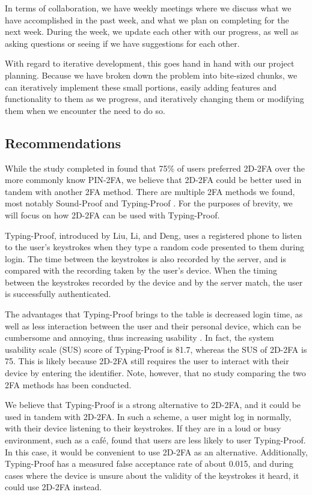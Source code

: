 \documentclass[11pt]{article} %
\begin{document}
In terms of collaboration, we have weekly meetings where we discuss what
we have accomplished in the past week, and what we plan on completing
for the next week. During the week, we update each other with our
progress, as well as asking questions or seeing if we have suggestions
for each other. 

With regard to iterative development, this goes hand in hand with our
project planning. Because we have broken down the problem into
bite-sized chunks, we can iteratively implement these small portions,
easily adding features and functionality to them as we progress, and
iteratively changing them or modifying them when we encounter the need
to do so.

\subsection{Recommendations}

While the study completed in \cite{shirvanian2d2fa} found that 75\% of
users preferred 2D-2FA over the more commonly know PIN-2FA, we believe
that 2D-2FA could be better used in tandem with another 2FA method.
There are multiple 2FA methods we found, most notably Sound-Proof
\cite{soundProof} and Typing-Proof \cite{liuTypingProof}. For the
purposes of brevity, we will focus on how 2D-2FA can be used with
Typing-Proof. 

Typing-Proof, introduced by Liu, Li, and Deng, uses a registered phone
to listen to the user's keystrokes when they type a random code
presented to them during login. The time between the keystrokes is also
recorded by the server, and is compared with the recording taken by the
user's device. When the timing between the keystrokes recorded by the
device and by the server match, the user is successfully authenticated. 

The advantages that Typing-Proof brings to the table is decreased login
time, as well as less interaction between the user and their personal
device, which can be cumbersome and annoying, thus increasing usability
\cite{liuTypingProof}. In fact, the system usability scale (SUS) score
of Typing-Proof is 81.7, whereas the SUS of 2D-2FA is 75. This is likely
because 2D-2FA still requires the user to interact with their device by
entering the identifier. Note, however, that no study comparing the two
2FA methods has been conducted.  

We believe that Typing-Proof is a strong alternative to 2D-2FA, and it
could be used in tandem with 2D-2FA. In such a scheme, a user might
log in normally, with their device listening to their keystrokes. If
they are in a loud or busy environment, such as a caf\'e,
\cite{liuTypingProof} found that users are less likely to user
Typing-Proof. In this case, it would be convenient to use 2D-2FA as an
alternative. Additionally, Typing-Proof has a measured false acceptance
rate of about 0.015, and during cases where the device is unsure about
the validity of the keystrokes it heard, it could use 2D-2FA instead.




\end{document}
